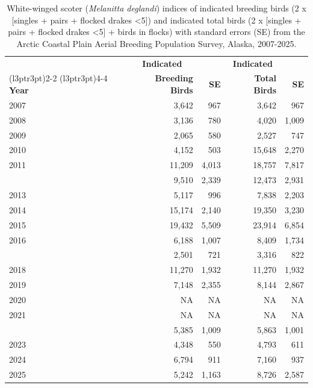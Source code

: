 \documentclass[
]{article}
\begin{document}
\begin{longtable}[t]{lrrrr}

\caption{\label{tbl-WWSC}White-winged scoter (\emph{Melanitta deglandi})
indices of indicated breeding birds (2 x {[}singles + pairs + flocked
drakes \textless5{]}) and indicated total birds (2 x {[}singles + pairs
+ flocked drakes \textless5{]} + birds in flocks) with standard errors
(SE) from the Arctic Coastal Plain Aerial Breeding Population Survey,
Alaska, 2007-2025.}

\tabularnewline

\\
\toprule
\multicolumn{1}{c}{\textbf{ }} & \multicolumn{1}{c}{\textbf{Indicated}} & \multicolumn{1}{c}{\textbf{ }} & \multicolumn{1}{c}{\textbf{Indicated}} & \multicolumn{1}{c}{\textbf{ }} \\
\cmidrule(l{3pt}r{3pt}){2-2} \cmidrule(l{3pt}r{3pt}){4-4}
\textbf{Year} & \textbf{Breeding Birds} & \textbf{SE} & \textbf{Total Birds} & \textbf{SE}\\
\midrule
2007 & 3,642 & 967 & 3,642 & 967\\
2008 & 3,136 & 780 & 4,020 & 1,009\\
2009 & 2,065 & 580 & 2,527 & 747\\
2010 & 4,152 & 503 & 15,648 & 2,270\\
2011 & 11,209 & 4,013 & 18,757 & 7,817\\
\addlinespace
2012 & 9,510 & 2,339 & 12,473 & 2,931\\
2013 & 5,117 & 996 & 7,838 & 2,203\\
2014 & 15,174 & 2,140 & 19,350 & 3,230\\
2015 & 19,432 & 5,509 & 23,914 & 6,854\\
2016 & 6,188 & 1,007 & 8,409 & 1,734\\
\addlinespace
2017 & 2,501 & 721 & 3,316 & 822\\
2018 & 11,270 & 1,932 & 11,270 & 1,932\\
2019 & 7,148 & 2,355 & 8,144 & 2,867\\
2020 & NA & NA & NA & NA\\
2021 & NA & NA & NA & NA\\
\addlinespace
2022 & 5,385 & 1,009 & 5,863 & 1,001\\
2023 & 4,348 & 550 & 4,793 & 611\\
2024 & 6,794 & 911 & 7,160 & 937\\
2025 & 5,242 & 1,163 & 8,726 & 2,587\\
\bottomrule

\end{longtable}
\end{document}
